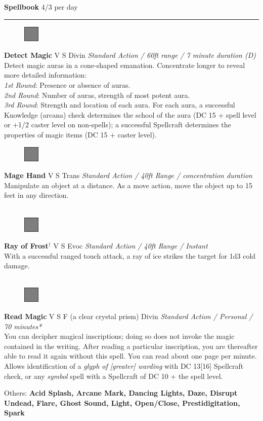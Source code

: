 \documentclass[letterpaper]{article}
\newcommand{\e}[1]{\emph{#1}}
\newcommand{\B}[1]{\textbf{#1}}
\newcommand{\D}[0]{$^\dag$}
\newcommand{\spell}[7]{
\begin{figure}
\vspace{-13pt}
\ifstrequal{#2}{Full}{  \includegraphics[width=2em]{Checkbox-Full}}{
\ifstrequal{#2}{Scroll}{\includegraphics[width=2em]{Checkbox-S}}{
                        \includegraphics[width=2em]{Checkbox}}}
\ifstrequal{#7}{}{\vspace{-1em}}{\vspace{#7}}
\end{figure}
 \B{#1} #3 {
    \ifstrequal{#4}{Conj}{\color{Plum}Conj}{%
    \ifstrequal{#4}{Divin}{\color{YellowOrange}Divin}{%
    \ifstrequal{#4}{Ench}{\color{VioletRed}Ench}{%
    \ifstrequal{#4}{Trans}{\color{LimeGreen}Trans}{%
    \ifstrequal{#4}{Evoc}{\color{RedOrange}Evoc}{%
    \ifstrequal{#4}{Illu}{\color{ProcessBlue}Illu}{%
    \ifstrequal{#4}{Abjur}{\color{CadetBlue}Abjur}{%
    \ifstrequal{#4}{Necro}{\color{Red}Necro}{%
}}}}}}}}}
{\footnotesize \e{#5}} \\
#6
}
\begin{document}
{\huge \B{Spellbook}} \hspace{2em}4/3 per day\par
\hrule\vspace{0.5em}

\spell{Detect Magic}{Full}{V S}{Divin}{Standard Action / 60ft range / 7 minute duration (D)}{
Detect magic auras in a cone-shaped emanation.  Concentrate longer to reveal more detailed information:\\
\e{1st Round}: Presence or absence of auras.\\
\e{2nd Round}: Number of auras, strength of most potent aura.\\
\e{3rd Round}: Strength and location of each aura.  For each aura, a successful Knowledge (arcana) check determines the school of the aura (DC 15 + spell level or +1/2 caster level on non-spells); a successful Spellcraft determines the properties of magic items (DC 15 + caster level).}{3em} %

\spell{Mage Hand}{Full}{V S}{Trans}{Standard Action / 40ft Range / concentration duration}{%
Manipulate an object at a distance. As a move action, move the object up to 15 feet in any direction.\\}{}\\[-2em] %

\spell{Ray of Frost\D}{Full}{V S}{Evoc}{Standard Action / 40ft Range / Instant}{
With a successful ranged touch attack, a ray of ice strikes the target for 1d3 cold damage.\\}{}\\[-2em] %

\spell{Read Magic}{Full}{V S F (a clear crystal prism)}{Divin}{Standard Action / Personal / 70 minutes*}{
You can decipher magical inscriptions; doing so does not invoke the magic contained in the writing.  After reading a particular inscription, you are thereafter able to read it again without this spell.  You can read about one page per minute. Allows identification of a \e{glyph of [greater] warding} with DC 13[16] Spellcraft check, or any \e{symbol} spell with a Spellcraft of DC 10 + the spell level.}{1em}\\[-1em] %
\begin{adjustwidth}{3em}{0em}
Others: \B{Acid Splash, Arcane Mark, Dancing Lights, Daze, Disrupt Undead, Flare, Ghost Sound, Light, Open/Close, Prestidigitation, Spark}\\
\end{adjustwidth}
\end{document}
